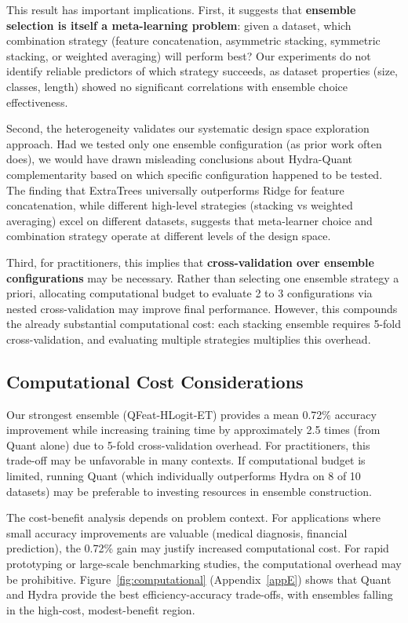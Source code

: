 \documentclass[pdflatex,sn-basic]{sn-jnl}           %
\theoremstyle{thmstyleone}%
\theoremstyle{thmstyletwo}%
\theoremstyle{thmstylethree}%
\begin{document}
This result has important implications. First, it suggests that \textbf{ensemble selection is itself a meta-learning problem}: given a dataset, which combination strategy (feature concatenation, asymmetric stacking, symmetric stacking, or weighted averaging) will perform best? Our experiments do not identify reliable predictors of which strategy succeeds, as dataset properties (size, classes, length) showed no significant correlations with ensemble choice effectiveness.

Second, the heterogeneity validates our systematic design space exploration approach. Had we tested only one ensemble configuration (as prior work often does), we would have drawn misleading conclusions about Hydra-Quant complementarity based on which specific configuration happened to be tested. The finding that ExtraTrees universally outperforms Ridge for feature concatenation, while different high-level strategies (stacking vs weighted averaging) excel on different datasets, suggests that meta-learner choice and combination strategy operate at different levels of the design space.

Third, for practitioners, this implies that \textbf{cross-validation over ensemble configurations} may be necessary. Rather than selecting one ensemble strategy a priori, allocating computational budget to evaluate 2 to 3 configurations via nested cross-validation may improve final performance. However, this compounds the already substantial computational cost: each stacking ensemble requires 5-fold cross-validation, and evaluating multiple strategies multiplies this overhead.

\subsection{Computational Cost Considerations}

Our strongest ensemble (QFeat-HLogit-ET) provides a mean 0.72\% accuracy improvement while increasing training time by approximately 2.5 times (from Quant alone) due to 5-fold cross-validation overhead. For practitioners, this trade-off may be unfavorable in many contexts. If computational budget is limited, running Quant (which individually outperforms Hydra on 8 of 10 datasets) may be preferable to investing resources in ensemble construction.

The cost-benefit analysis depends on problem context. For applications where small accuracy improvements are valuable (medical diagnosis, financial prediction), the 0.72\% gain may justify increased computational cost. For rapid prototyping or large-scale benchmarking studies, the computational overhead may be prohibitive. Figure~\ref{fig:computational} (Appendix~\ref{appE}) shows that Quant and Hydra provide the best efficiency-accuracy trade-offs, with ensembles falling in the high-cost, modest-benefit region.
\end{document}
